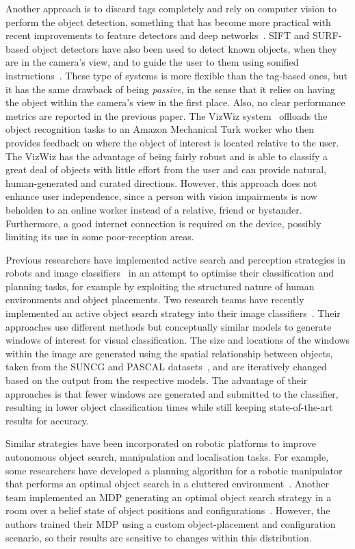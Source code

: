 \documentclass[a4paper, twoside]{article}
\begin{document}
Another approach is to discard tags completely and rely on computer vision to perform the object detection, something that has become more practical with recent improvements to feature detectors and deep networks~\cite{huang2017speed,redmon2016you}. SIFT and SURF-based object detectors have also been used to detect known objects, when they are in the camera's view, and to guide the user to them using sonified instructions~\cite{schauerte2012assistive}. These type of systems is more flexible than the tag-based ones, but it has the same drawback of being {\em passive}, in the sense that it relies on having the object within the camera's view in the first place. Also, no clear performance metrics are reported in the previous paper. The VizWiz system~\cite{bigham2010vizwiz} offloads the object recognition tasks to an Amazon Mechanical Turk worker who then provides feedback on where the object of interest is located relative to the user. The VizWiz has the advantage of being fairly robust and is able to classify a great deal of objects with little effort from the user and can provide natural, human-generated and curated directions. However, this approach does not enhance user independence, since a person with vision impairments is now beholden to an online worker instead of a relative, friend or bystander. Furthermore, a good internet connection is required on the device, possibly limiting its use in some poor-reception areas.

Previous researchers have implemented active search and perception strategies in robots and image classifiers~\cite{Bajcsy2017} in an attempt to optimise their classification and planning tasks, for example by exploiting the structured nature of human environments and object placements. 
%
Two research teams have recently implemented an active object search strategy into their image classifiers~\cite{caicedo2015active,gonzalez2015active}. Their approaches use different methods but conceptually similar models to generate windows of interest for visual classification. The size and locations of the windows within the image are generated using the spatial relationship between objects, taken from the SUNCG and PASCAL datasets~\cite{song2016ssc,Everingham10}, and are iteratively changed based on the output from the respective models. The advantage of their approaches is that fewer windows are generated and submitted to the classifier, resulting in lower object classification times while still keeping state-of-the-art results for accuracy. 

Similar strategies have been incorporated on robotic platforms to improve autonomous object search, manipulation and localisation tasks. For example, some researchers have developed a planning algorithm for a robotic manipulator that performs an optimal object search in a cluttered environment~\cite{dogar2014object}. Another team implemented an MDP generating an optimal object search strategy in a room over a belief state of object positions and configurations~\cite{aydemir2011search}. However, the authors trained their MDP using a custom object-placement and configuration scenario, so their results are sensitive to changes within this distribution. 
\end{document}
